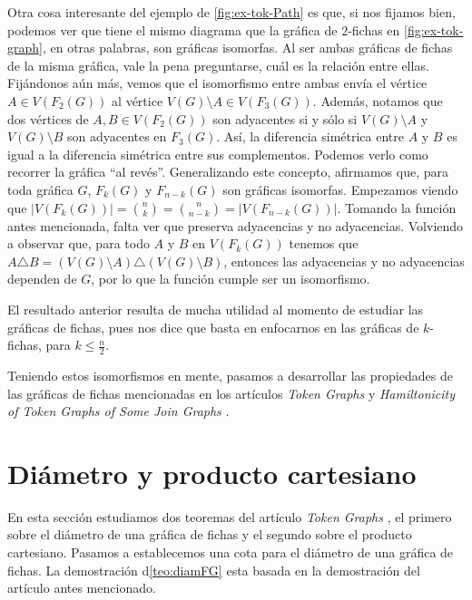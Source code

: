 Otra cosa interesante del ejemplo de \cref{fig:ex-tok-Path} es que, si nos
fijamos bien, podemos ver que tiene el mismo diagrama que la gr\'afica de
$2$-fichas en \cref{fig:ex-tok-graph}, en otras palabras, son gr\'aficas
isomorfas. Al ser ambas gr\'aficas de fichas de la misma gr\'afica, vale la pena
preguntarse, cu\'al es la relaci\'on entre ellas. Fij\'andonos a\'un m\'as,
vemos que el isomorfismo entre ambas env\'ia el v\'ertice $A \in V(F_2(G))$ al
v\'ertice $V(G) \setminus A \in V(F_3(G))$. Adem\'as, notamos que dos v\'ertices
de $ A,B \in V(F_2(G))$ son adyacentes si y s\'olo si $V(G) \setminus A$ y $V(G)
\setminus B$ son adyacentes en $F_3(G)$. As\'i, la diferencia sim\'etrica entre
$A$ y $B$ es igual a la diferencia sim\'etrica entre sus complementos. Podemos
verlo como recorrer la gr\'afica ``al rev\'es''. Generalizando este concepto,
afirmamos que, para toda gr\'afica $G$, $F_k(G)$ y $F_{n-k}(G)$ son gr\'aficas
isomorfas. Empezamos viendo que $|V(F_k(G))| =\binom{n}{k}= \binom{n}{n-k}=
|V(F_{n-k}(G))|$. Tomando la funci\'on antes mencionada, falta ver que preserva
adyacencias y no adyacencias. Volviendo a observar que, para todo $A$ y $B$ en
$V(F_k(G))$ tenemos que $A \triangle B = (V(G)\setminus A) \triangle
(V(G)\setminus B)$, entonces las adyacencias y no adyacencias dependen de $G$,
por lo que la funci\'on cumple ser un isomorfismo. 

El resultado anterior resulta de mucha utilidad al momento de estudiar las
gr\'aficas de fichas, pues nos dice que basta en enfocarnos en las gr\'aficas de
$k$-fichas, para $k \leq \frac{n}{2}$.

Teniendo estos isomorfismos en mente, pasamos a desarrollar las propiedades de
las gr\'aficas de fichas mencionadas en los art\'iculos \textit{Token Graphs}
\cite{fabilaToken} y \textit{Hamiltonicity of Token Graphs of Some Join Graphs}
\cite{adameHamilt}.


\section{Di\'ametro y producto cartesiano}%
\label{sec:etiquetas}

En esta secci\'on estudiamos dos teoremas del art\'iculo \textit{Token Graphs}
\cite{fabilaToken}, el primero sobre el di\'ametro de una gr\'afica de fichas y
el segundo sobre el producto cartesiano. Pasamos a establecemos una cota para el
di\'ametro de una gr\'afica de fichas. La demostraci\'on d\cref{teo:diamFG} esta basada
en la demostraci\'on del art\'iculo antes mencionado.

